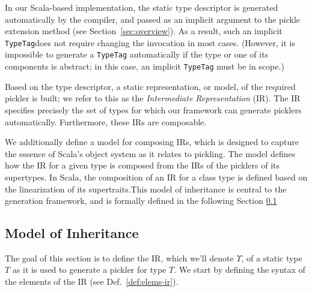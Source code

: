 \documentclass[10pt]{sigplanconf}
\theoremstyle{definition}
\theoremstyle{definition}
\newcommand{\term}[1]{\mbox{\texttt{#1}}}
\begin{document}
In our Scala-based implementation, the static type descriptor is generated
automatically by the compiler, and passed as an implicit argument to the
pickle extension method (see Section~\ref{sec:overview}). As a result, such an
implicit \term{TypeTag}\footnotemark[1] does not require changing the invocation in most cases.
(However, it is impossible to generate a \term{TypeTag} automatically if the
type or one of its components is abstract; in this case, an implicit
\term{TypeTag} must be in scope.)

Based on the type descriptor, a static representation, or model, of the
required pickler is built; we refer to this as the {\em Intermediate
Representation} (IR). The IR specifies precisely the set of types for which
our framework can generate picklers automatically. Furthermore, these IRs are composable.

We additionally define a model for composing IRs, which is designed to capture
the essence of Scala's object system as it relates to pickling. The model
defines how the IR for a given type is composed from the IRs of the picklers
of its supertypes. In Scala, the composition of an IR for a class type is
defined based on the linearization of its supertraits.\footnotemark[2]
This model of inheritance is central to the generation framework, and is
formally defined in the following Section \ref{sec:ir}



\subsection{Model of Inheritance}
\label{sec:ir}

The goal of this section is to define the IR, which we'll denote
$\Upsilon$, of a static type $T$ as it is used to generate a pickler for
type $T$. We start by defining the syntax of the elements of the IR
(see Def.~\ref{def:elems-ir}).
\end{document}
